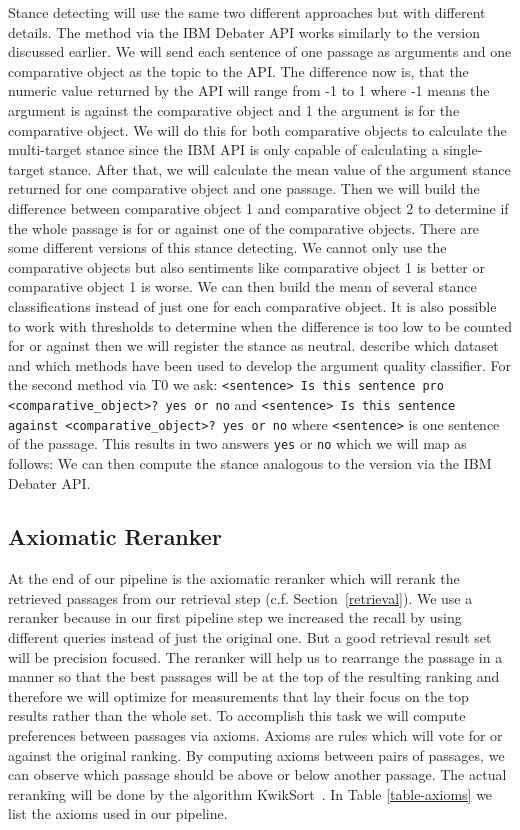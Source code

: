 Stance detecting will use the same two different approaches but with different details.
The method via the IBM Debater API works similarly to the version discussed earlier.
We will send each sentence of one passage as arguments and one comparative object as the topic to the API.
The difference now is, that the numeric value returned by the API will range from -1 to 1 where -1 means the argument is against the comparative object and 1 the argument is for the comparative object.
We will do this for both comparative objects to calculate the multi-target stance since the IBM API is only capable of calculating a single-target stance.
After that, we will calculate the mean value of the argument stance returned for one comparative object and one passage.
Then we will build the difference between comparative object 1 and comparative object 2 to determine if the whole passage is for or against one of the comparative objects.
There are some different versions of this stance detecting.
We cannot only use the comparative objects but also sentiments like comparative object 1 is better or comparative object 1 is worse.
We can then build the mean of several stance classifications instead of just one for each comparative object.
It is also possible to work with thresholds to determine when the difference is too low to be counted for or against then we will register the stance as neutral.
\citet{BarHaimBDSS2017} describe which dataset and which methods have been used to develop the argument quality classifier.
For the second method via T0 we ask: \texttt{<sentence> Is this sentence pro <comparative\_object>? yes or no} and \texttt{<sentence> Is this sentence against <comparative\_object>? yes or no} where \texttt{<sentence>} is one sentence of the passage.
This results in two answers \texttt{yes} or \texttt{no} which we will map as follows: 
We can then compute the stance analogous to the version via the IBM Debater API.

\subsection{Axiomatic Reranker}

At the end of our pipeline is the axiomatic reranker which will rerank the retrieved passages from our retrieval step (c.f. Section~\ref{retrieval}).
We use a reranker because in our first pipeline step we increased the recall by using different queries instead of just the original one.
But a good retrieval result set will be precision focused.
The reranker will help us to rearrange the passage in a manner so that the best passages will be at the top of the resulting ranking and therefore we will optimize for measurements that lay their focus on the top results rather than the whole set.
To accomplish this task we will compute preferences between passages via axioms.
Axioms are rules which will vote for or against the original ranking.
By computing axioms between pairs of passages, we can observe which passage should be above or below another passage.
The actual reranking will be done by the algorithm KwikSort~\cite{hagen:2016d}.
In Table \ref{table-axioms} we list the axioms used in our pipeline.

